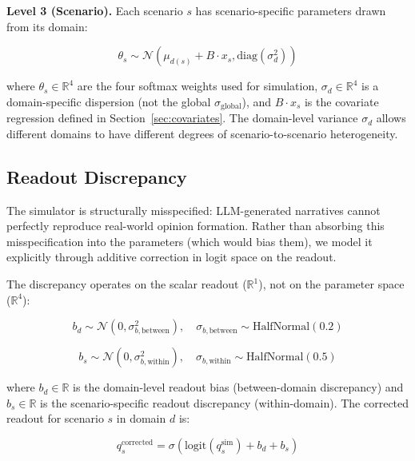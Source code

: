 \documentclass[12pt]{article}
\begin{document}
\textbf{Level 3 (Scenario).} Each scenario $s$ has scenario-specific parameters drawn from its domain:

\begin{equation}\label{eq:15}
\theta_s \sim \mathcal{N}(\mu_{d(s)} + B \cdot x_s, \text{diag}(\sigma_d^2))
\end{equation}

where $\theta_s \in \mathbb{R}^4$ are the four softmax weights used for simulation, $\sigma_d \in \mathbb{R}^4$ is a domain-specific dispersion (not the global $\sigma_{\text{global}}$), and $B \cdot x_s$ is the covariate regression defined in Section~\ref{sec:covariates}. The domain-level variance $\sigma_d$ allows different domains to have different degrees of scenario-to-scenario heterogeneity.

\subsection{Readout Discrepancy}

The simulator is structurally misspecified: LLM-generated narratives cannot perfectly reproduce real-world opinion formation. Rather than absorbing this misspecification into the parameters (which would bias them), we model it explicitly through additive correction in logit space on the readout.

The discrepancy operates on the scalar readout ($\mathbb{R}^1$), not on the parameter space ($\mathbb{R}^4$):

\begin{equation}\label{eq:16}
b_d \sim \mathcal{N}(0, \sigma_{b,\text{between}}^2), \quad \sigma_{b,\text{between}} \sim \text{HalfNormal}(0.2)
\end{equation}

\begin{equation}\label{eq:17}
b_s \sim \mathcal{N}(0, \sigma_{b,\text{within}}^2), \quad \sigma_{b,\text{within}} \sim \text{HalfNormal}(0.5)
\end{equation}

where $b_d \in \mathbb{R}$ is the domain-level readout bias (between-domain discrepancy) and $b_s \in \mathbb{R}$ is the scenario-specific readout discrepancy (within-domain). The corrected readout for scenario $s$ in domain $d$ is:

\begin{equation}\label{eq:18}
q_s^{\text{corrected}} = \sigma\!\left(\text{logit}(q_s^{\text{sim}}) + b_d + b_s\right)
\end{equation}
\end{document}
